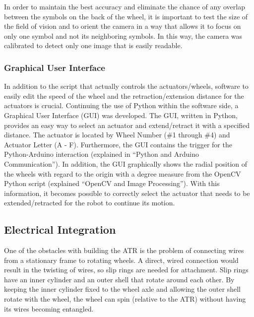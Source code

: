 \documentclass[12pt]{article}
\numberwithin{figure}{section}
\begin{document}
\begin{multicols}{2}
In order to maintain the best accuracy and eliminate the chance of any overlap between the symbols on the back of the wheel, it is important to test the size of the field of vision and to orient the camera in a way that allows it to focus on only one symbol and not its neighboring symbols. In this way, the camera was calibrated to detect only one image that is easily readable.
\subsubsection{Graphical User Interface}
In addition to the script that actually controls the actuators/wheels, software to easily edit the speed of the wheel and the retraction/extension distance for the actuators is crucial. Continuing the use of Python within the software side, a Graphical User Interface (GUI) was developed. The GUI, written in Python, provides an easy way to select an actuator and extend/retract it with a specified distance. The actuator is located by Wheel Number (\#1 through \#4) and Actuator Letter (A - F). Furthermore, the GUI contains the trigger for the Python-Arduino interaction (explained in “Python and Arduino Communication”). In addition, the GUI graphically shows the radial position of the wheels with regard to the origin with a degree measure from the OpenCV Python script (explained “OpenCV and Image Processing”). With this information, it becomes possible to correctly select the actuator that needs to be extended/retracted for the robot to continue its motion.

\subsection{Electrical Integration}
One of the obstacles with building the ATR is the problem of connecting wires from a stationary frame to rotating wheels. A direct, wired connection would result in the twisting of wires, so slip rings are needed for attachment. Slip rings have an inner cylinder and an outer shell that rotate around each other. By keeping the inner cylinder fixed to the wheel axle and allowing the outer shell rotate with the wheel, the wheel can spin (relative to the ATR) without having its wires becoming entangled. 


\end{multicols}
\end{document}
